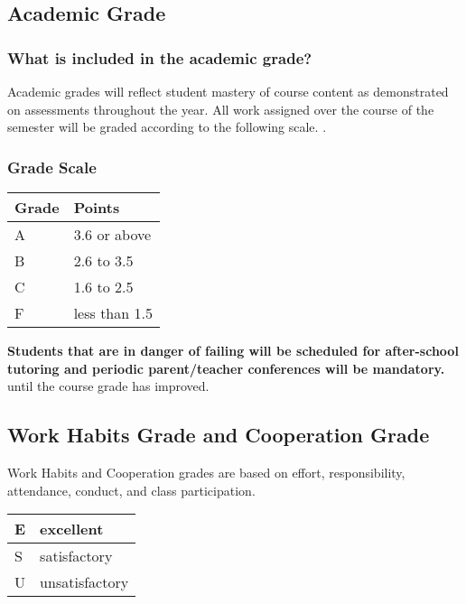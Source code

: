 \documentclass[11pt]{article}
\begin{document}
\subsection{Academic Grade}
\label{sec:orge059b01}
\subsubsection{What is included in the academic grade?}
\label{sec:org6f3d5cd}
Academic grades will reflect student mastery of course content as demonstrated on assessments throughout the year. All work assigned over the course of the semester will be graded according to the following scale.
. 
\subsubsection{Grade Scale}
\label{sec:org0dc9dfa}

\begin{center}
\begin{tabular}{ll}
\hline
Grade & Points\\[0pt]
\hline
A & 3.6 or above\\[0pt]
\hline
B & 2.6 to 3.5\\[0pt]
\hline
C & 1.6 to 2.5\\[0pt]
\hline
F & less than 1.5\\[0pt]
\hline
\end{tabular}
\end{center}

\textbf{\textbf{Students that are in danger of failing will be scheduled for after-school tutoring and periodic parent/teacher conferences will be mandatory.}} until the course grade has improved.

\subsection{Work Habits Grade and Cooperation Grade}
\label{sec:org5c8b6b8}

Work Habits and Cooperation grades are based on effort, responsibility, attendance, conduct, and class participation. 
\begin{center}
\begin{tabular}{ll}
\hline
E & excellent\\[0pt]
\hline
S & satisfactory\\[0pt]
\hline
U & unsatisfactory\\[0pt]
\hline
\end{tabular}
\end{center}
\end{document}
